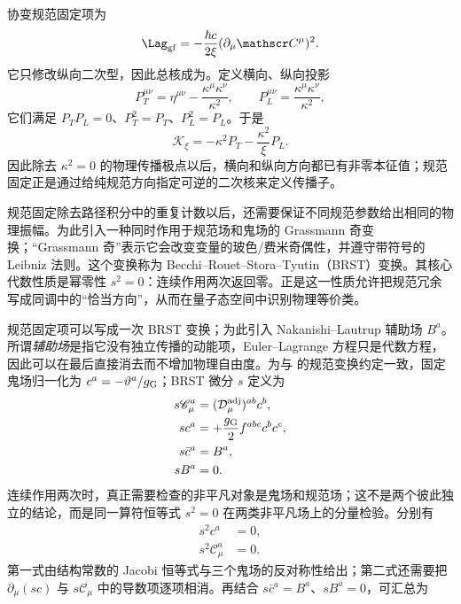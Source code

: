 \begin{exbox}[自由 $U(1)$ 场中的规范零模]
协变规范固定项为
\begin{equation*}
 \Lag_{\rm gf}
 =-\frac{\hbar c}{2\xi}(\partial_\mu\mathscr C^\mu)^2.
\end{equation*}
它只修改纵向二次型，因此总核成为。定义横向、纵向投影
\begin{equation*}
 P_T^{\mu\nu}=\eta^{\mu\nu}-\frac{\kappa^\mu\kappa^\nu}{\kappa^2},
 \qquad
 P_L^{\mu\nu}=\frac{\kappa^\mu\kappa^\nu}{\kappa^2},
\end{equation*}
它们满足 $P_TP_L=0$、$P_T^2=P_T$、$P_L^2=P_L$。于是
\begin{equation*}
 \mathcal K_\xi
 =-\kappa^2 P_T-\frac{\kappa^2}{\xi}P_L.
\end{equation*}
因此除去 $\kappa^2=0$ 的物理传播极点以后，横向和纵向方向都已有非零本征值；规范固定正是通过给纯规范方向指定可逆的二次核来定义传播子。
\end{exbox}

规范固定除去路径积分中的重复计数以后，还需要保证不同规范参数给出相同的物理振幅。为此引入一种同时作用于规范场和鬼场的 Grassmann 奇变换；“Grassmann 奇”表示它会改变变量的玻色/费米奇偶性，并遵守带符号的 Leibniz 法则。这个变换称为 Becchi--Rouet--Stora--Tyutin（BRST）变换。其核心代数性质是幂零性 $s^2=0$：连续作用两次返回零。正是这一性质允许把规范冗余写成同调中的“恰当方向”，从而在量子态空间中识别物理等价类。

规范固定项可以写成一次 BRST 变换；为此引入 Nakanishi--Lautrup 辅助场 $B^a$。所谓\emph{辅助场}是指它没有独立传播的动能项，Euler--Lagrange 方程只是代数方程，因此可以在最后直接消去而不增加物理自由度。为与 的规范变换约定一致，固定鬼场归一化为 $c^a=-\vartheta^a/g_{\rm G}$；BRST 微分 $s$ 定义为
\begin{align}
 s\mathscr C_\mu^a
 &=(\mathcal D_\mu^{\rm adj})^{ab}c^b,\\
 sc^a
 &=+\frac {g_{\rm G}}2 f^{abc}c^bc^c,\\
 s\bar c^a
 &=B^a,\\
 sB^a&=0.
 \label{eq:brst-transform-general-dp11}
\end{align}
连续作用两次时，真正需要检查的非平凡对象是鬼场和规范场；这不是两个彼此独立的结论，而是同一算符恒等式 $s^2=0$ 在两类非平凡场上的分量检验。分别有
\begin{align}
 s^2c^a&=0,
 \label{eq:brst-ghost-nilpotent-dp68}\\
 s^2\mathscr C_\mu^a&=0.
 \label{eq:brst-gauge-nilpotent-dp68}
\end{align}
第一式由结构常数的 Jacobi 恒等式与三个鬼场的反对称性给出；第二式还需要把 $\partial_\mu(sc)$ 与 $s\mathscr C_\mu$ 中的导数项逐项相消。再结合 $s\bar c^a=B^a$、$sB^a=0$，可汇总为



